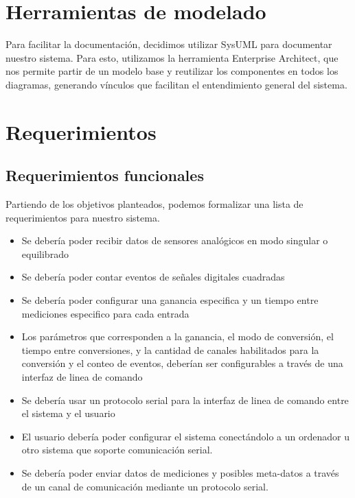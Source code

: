 \section{Herramientas de modelado} %
\label{sec:herramientas_de_modelado}

Para facilitar la documentación, decidimos utilizar SysUML para documentar nuestro sistema. Para esto, utilizamos la herramienta Enterprise Architect, que nos permite partir de un modelo base y reutilizar los componentes en todos los diagramas, generando vínculos que facilitan el entendimiento general del sistema. 


\section{Requerimientos} %
\label{sec:requerimientos}

\subsection{Requerimientos funcionales} %
\label{sub:requerimientos_funcionales}

Partiendo de los objetivos planteados, podemos formalizar una lista de requerimientos para nuestro sistema.

\begin{itemize}
	\item Se debería poder recibir datos de sensores analógicos en modo singular o equilibrado
	\item Se debería poder contar eventos de señales digitales cuadradas
	\item Se debería poder configurar una ganancia especifica y un tiempo entre mediciones especifico para cada entrada
	\item Los parámetros que corresponden a la ganancia, el modo de conversión, el tiempo entre conversiones, y la cantidad de canales habilitados para la conversión y el conteo de eventos, deberían ser configurables a través de una interfaz de linea de comando
	\item Se debería usar un protocolo serial para la interfaz de linea de comando entre el sistema y el usuario
	\item El usuario debería poder configurar el sistema conectándolo a un ordenador u otro sistema que soporte comunicación serial.
	\item Se debería poder enviar datos de mediciones y posibles meta-datos a través de un canal de comunicación mediante un protocolo serial.
\end{itemize}

